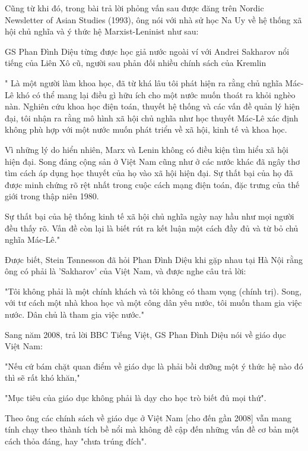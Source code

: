 Cũng từ khi đó, trong bài trả lời phỏng vấn sau được đăng trên Nordic Newsletter of Asian Studies (1993), ông nói với nhà sử học Na Uy về hệ thống xã hội chủ nghĩa và ý thức hệ Marxist-Leninist như sau:

GS Phan Đình Diệu từng được học giả nước ngoài ví với Andrei Sakharov nổi tiếng của Liên Xô cũ, người sau phản đối nhiều chính sách của Kremlin

" Là một người làm khoa học, đã từ khá lâu tôi phát hiện ra rằng chủ nghĩa Mác-Lê khó có thể mang lại điều gì hữu ích cho một nước muốn thoát ra khỏi nghèo nàn. Nghiên cứu khoa học điện toán, thuyết hệ thống và các vấn đề quản lý hiện đại, tôi nhận ra rằng mô hình xã hội chủ nghĩa như học thuyết Mác-Lê xác định không phù hợp với một nước muốn phát triển về xã hội, kinh tế và khoa học.

Vì những lý do hiển nhiên, Marx và Lenin không có điều kiện tìm hiểu xã hội hiện đại. Song đảng cộng sản ở Việt Nam cũng như ở các nước khác đã ngây thơ tìm cách áp dụng học thuyết của họ vào xã hội hiện đại. Sự thất bại của họ đã được minh chứng rõ rệt nhất trong cuộc cách mạng điện toán, đặc trưng của thế giới trong thập niên 1980.

Sự thất bại của hệ thống kinh tế xã hội chủ nghĩa ngày nay hầu như mọi người đều thấy rõ. Vấn đề còn lại là biết rút ra kết luận một cách đầy đủ và từ bỏ chủ nghĩa Mác-Lê."

Được biết, Stein Tønnesson đã hỏi Phan Đình Diệu khi gặp nhau tại Hà Nội rằng ông có phải là 'Sakharov' của Việt Nam, và được nghe câu trả lời:

"Tôi không phải là một chính khách và tôi không có tham vọng (chính trị). Song, với tư cách một nhà khoa học và một công dân yêu nước, tôi muốn tham gia việc nước. Dân chủ là tham gia việc nước."

Sang năm 2008, trả lời BBC Tiếng Việt, GS Phan Đình Diệu nói về giáo dục Việt Nam:

"Nếu cứ bám chặt quan điểm về giáo dục là phải bồi dưỡng một ý thức hệ nào đó thì sẽ rất khó khăn,"

"Mục tiêu của giáo dục không phải là dạy cho học trò biết đủ mọi thứ".

Theo ông các chính sách về giáo dục ở Việt Nam [cho đến gần 2008] vẫn mang tính chạy theo thành tích bề nổi mà không đề cập đến những vấn đề cơ bản một cách thỏa đáng, hay "chưa trúng đích".

